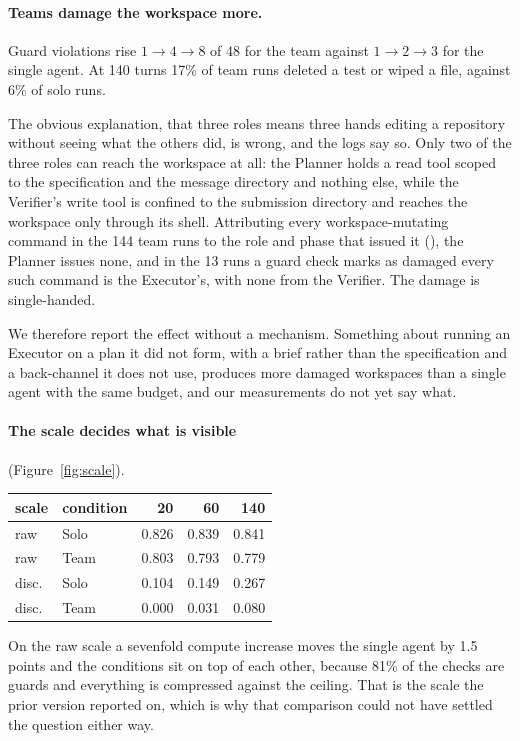 \documentclass[11pt]{article}
\newcommand{\pth}[1]{\path{#1}}
\begin{document}
\paragraph{Teams damage the workspace more.} Guard violations rise
$1 \to 4 \to 8$ of 48 for the team against $1 \to 2 \to 3$ for the single agent.
At 140 turns 17\% of team runs deleted a test or wiped a file, against 6\% of
solo runs.

The obvious explanation, that three roles means three hands editing a repository
without seeing what the others did, is wrong, and the logs say so. Only two of
the three roles can reach the workspace at all: the Planner holds a read tool
scoped to the specification and the message directory and nothing else, while
the Verifier's write tool is confined to the submission directory and reaches
the workspace only through its shell. Attributing every workspace-mutating
command in the 144 team runs to the role and phase that issued it
(\pth{scripts/damage_attribution.py}), the Planner issues none, and in the 13
runs a guard check marks as damaged every such command is the Executor's, with
none from the Verifier. The damage is single-handed.

We therefore report the effect without a mechanism. Something about running an
Executor on a plan it did not form, with a brief rather than the specification
and a back-channel it does not use, produces more damaged workspaces than a
single agent with the same budget, and our measurements do not yet say what.

\paragraph{The scale decides what is visible} (Figure~\ref{fig:scale}).
\begin{center}\small
\begin{tabular}{llrrr}
\toprule
scale & condition & 20 & 60 & 140 \\
\midrule
raw  & Solo & 0.826 & 0.839 & 0.841 \\
raw  & Team & 0.803 & 0.793 & 0.779 \\
disc.& Solo & 0.104 & 0.149 & 0.267 \\
disc.& Team & 0.000 & 0.031 & 0.080 \\
\bottomrule
\end{tabular}
\end{center}
On the raw scale a sevenfold compute increase moves the single agent by 1.5
points and the conditions sit on top of each other, because 81\% of the checks
are guards and everything is compressed against the ceiling. That is the scale
the prior version reported on, which is why that comparison could not have
settled the question either way.
\end{document}
